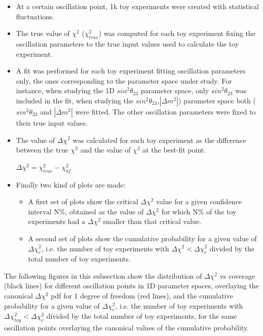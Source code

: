 \begin{itemize}
\item{At a certain oscillation point, 1k toy experiments were created with statistical fluctuations.}
\item{The true value of $\chi^{2}$ ($\chi^{2} _{true}$) was computed for each toy experiment fixing the oscillation parameters to the true input values used to calculate the toy experiment.}
\item{A fit was performed for each toy experiment fitting oscillation parameters only, the ones corresponding to the parameter space under study. For instance, when studying the 1D $sin^{2}\theta_{23}$ parameter space, only $sin^{2}\theta_{23}$ was included in the fit, when studying  the $sin^{2}\theta_{23}$,$|\Delta m^{2}|$) parameter space both ($sin^{2}\theta_{23}$ and $|\Delta m^{2}|$ were fitted. The other oscillation parameters were fixed to their true input values. }
\item{The value of $\Delta\chi^{2}$ was calculated for each toy experiment as the difference between the true $\chi^{2}$ and the value of $\chi^{2}$ at the best-fit point.}
\begin{center}
$\Delta\chi^{2} = \chi^{2} _{true} - \chi^{2}_{bf}$
\end{center}
\item{Finally two kind of plots are made: 
\begin{itemize}
\item{A first set of plots show the critical $\Delta\chi^{2}$ value for a given confidence interval N\%, obtained as the value of $\Delta\chi^{2}$ for which N\% of the toy experiments had a $\Delta\chi^{2}$ smaller than that critical value.}
\item{A second set of plots show the cumulative probability for a given value of $\Delta\chi^{2}_{c}$, i.e. the number of toy experiments with $\Delta\chi^{2} < \Delta\chi^{2}_{c}$ divided by the total number of toy experiments.}
\end{itemize}
}
\end{itemize}

The following figures in this subsection show the distribution of $\Delta\chi^{2}$ vs coverage 
(black lines) for different oscillation points in 1D parameter spaces, overlaying the canonical
$\Delta\chi^{2}$ pdf for 1 degree of freedom (red lines), and  the cumulative probability for a 
given value of $\Delta\chi^{2}_{c}$, i.e. the number of toy experiments with $\Delta\chi^{2}_{toy} < \Delta\chi^{2}_{c}$
divided by the total number of toy experiments, for the same oscillation points overlaying the canonical values of the cumulative probability.

